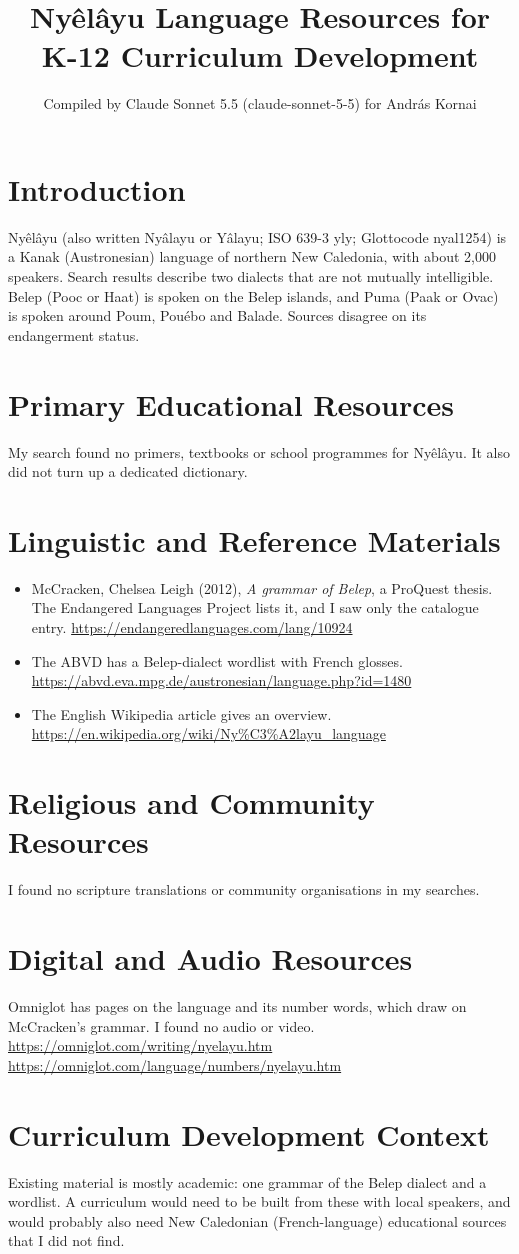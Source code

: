 \documentclass[12pt]{article}
\title{Ny\^el\^ayu Language Resources for K-12 Curriculum Development}
\author{Compiled by Claude Sonnet 5.5 (claude-sonnet-5-5) for Andr\'as Kornai}
\date{}
\begin{document}
\maketitle

\section{Introduction}
Ny\^el\^ayu (also written Ny\^alayu or Y\^alayu; ISO 639-3 yly; Glottocode nyal1254) is a Kanak (Austronesian) language of northern New Caledonia, with about 2,000 speakers. Search results describe two dialects that are not mutually intelligible. Belep (Pooc or Haat) is spoken on the Belep islands, and Puma (Paak or Ovac) is spoken around Poum, Pouébo and Balade. Sources disagree on its endangerment status.

\section{Primary Educational Resources}
My search found no primers, textbooks or school programmes for Ny\^el\^ayu. It also did not turn up a dedicated dictionary.

\section{Linguistic and Reference Materials}
\begin{itemize}
\item McCracken, Chelsea Leigh (2012), \emph{A grammar of Belep}, a ProQuest thesis. The Endangered Languages Project lists it, and I saw only the catalogue entry. \url{https://endangeredlanguages.com/lang/10924}
\item The ABVD has a Belep-dialect wordlist with French glosses. \url{https://abvd.eva.mpg.de/austronesian/language.php?id=1480}
\item The English Wikipedia article gives an overview. \url{https://en.wikipedia.org/wiki/Ny%C3%A2layu_language}
\end{itemize}

\section{Religious and Community Resources}
I found no scripture translations or community organisations in my searches.

\section{Digital and Audio Resources}
Omniglot has pages on the language and its number words, which draw on McCracken's grammar. I found no audio or video. \url{https://omniglot.com/writing/nyelayu.htm} \url{https://omniglot.com/language/numbers/nyelayu.htm}

\section{Curriculum Development Context}
Existing material is mostly academic: one grammar of the Belep dialect and a wordlist. A curriculum would need to be built from these with local speakers, and would probably also need New Caledonian (French-language) educational sources that I did not find.
\end{document}
